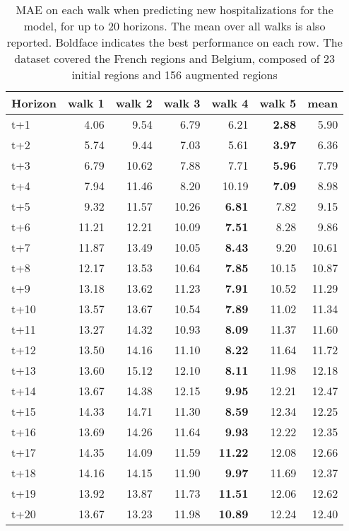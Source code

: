 \begin{table}[H]
\centering
\caption{MAE on each walk when predicting new hospitalizations for the model, for up to 20 horizons. The mean over all walks is also reported. Boldface indicates the best performance on each row. The dataset covered the French regions and Belgium, composed of 23 initial regions and 156 augmented regions }
\label{tab:MAE_walk_dense_model}
\begin{tabular}{lrrrrrr}
\toprule
Horizon &  walk 1 &  walk 2 &  walk 3 &  walk 4 &  walk 5 &  mean \\
\midrule
t+1  & 4.06  & 9.54  & 6.79  & 6.21  & \textbf{2.88}  & 5.90  \\
t+2  & 5.74  & 9.44  & 7.03  & 5.61  & \textbf{3.97}  & 6.36  \\
t+3  & 6.79  & 10.62  & 7.88  & 7.71  & \textbf{5.96}  & 7.79  \\
t+4  & 7.94  & 11.46  & 8.20  & 10.19  & \textbf{7.09}  & 8.98  \\
t+5  & 9.32  & 11.57  & 10.26  & \textbf{6.81}  & 7.82  & 9.15  \\
t+6  & 11.21  & 12.21  & 10.09  & \textbf{7.51}  & 8.28  & 9.86  \\
t+7  & 11.87  & 13.49  & 10.05  & \textbf{8.43}  & 9.20  & 10.61  \\
t+8  & 12.17  & 13.53  & 10.64  & \textbf{7.85}  & 10.15  & 10.87  \\
t+9  & 13.18  & 13.62  & 11.23  & \textbf{7.91}  & 10.52  & 11.29  \\
t+10  & 13.57  & 13.67  & 10.54  & \textbf{7.89}  & 11.02  & 11.34  \\
t+11  & 13.27  & 14.32  & 10.93  & \textbf{8.09}  & 11.37  & 11.60  \\
t+12  & 13.50  & 14.16  & 11.10  & \textbf{8.22}  & 11.64  & 11.72  \\
t+13  & 13.60  & 15.12  & 12.10  & \textbf{8.11}  & 11.98  & 12.18  \\
t+14  & 13.67  & 14.38  & 12.15  & \textbf{9.95}  & 12.21  & 12.47  \\
t+15  & 14.33  & 14.71  & 11.30  & \textbf{8.59}  & 12.34  & 12.25  \\
t+16  & 13.69  & 14.26  & 11.64  & \textbf{9.93}  & 12.22  & 12.35  \\
t+17  & 14.35  & 14.09  & 11.59  & \textbf{11.22}  & 12.08  & 12.66  \\
t+18  & 14.16  & 14.15  & 11.90  & \textbf{9.97}  & 11.69  & 12.37  \\
t+19  & 13.92  & 13.87  & 11.73  & \textbf{11.51}  & 12.06  & 12.62  \\
t+20  & 13.67  & 13.23  & 11.98  & \textbf{10.89}  & 12.24  & 12.40  \\

\bottomrule
\end{tabular}
\end{table}
